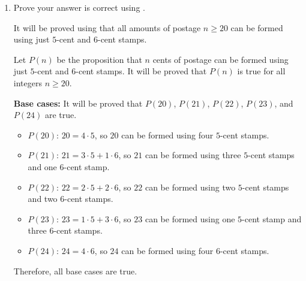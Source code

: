 \begin{enumerate}
\begin{enumerate}
\begin{subprove}
      Since \(k \geq 24\), consider any representation of \(k\) cents using \(5\)-cent and \(6\)-cent stamps.
      Two cases will be considered:
      \begin{itemize}
        \item \textbf{Case 1:} The representation uses at least one \(5\)-cent stamp.
        Then by replacing one \(5\)-cent stamp with one \(6\)-cent stamp, \(k+1 = k - 5 + 6\) cents can be formed.
        \item \textbf{Case 2:} The representation uses no \(5\)-cent stamps (only \(6\)-cent stamps).
        Since \(k \geq 24\) and \(k\) is formed using only \(6\)-cent stamps, there are at least \(\lceil 24/6 \rceil = 4\) stamps.
        By replacing four \(6\)-cent stamps (totaling \(24\) cents) with five \(5\)-cent stamps (totaling \(25\) cents), \(k+1 = k - 24 + 25 = k + 1\) cents can be formed.
      \end{itemize}
      In both cases, \(k+1\) cents can be formed.
      Therefore, \(P(k+1)\) is true.
      
      By , it follows that \(P(n)\) is true for all integers \(n \geq 20\).
      
      Therefore, all amounts of postage \(n \geq 20\) can be formed using just \(5\)-cent and \(6\)-cent stamps.
    \end{subprove}
    \item Prove your answer is correct using .
    \begin{subprove}
      It will be proved using  that all amounts of postage \(n \geq 20\) can be formed using just \(5\)-cent and \(6\)-cent stamps.
      
      Let \(P(n)\) be the proposition that \(n\) cents of postage can be formed using just \(5\)-cent and \(6\)-cent stamps.
      It will be proved that \(P(n)\) is true for all integers \(n \geq 20\).
      
      \textbf{Base cases:} It will be proved that \(P(20)\), \(P(21)\), \(P(22)\), \(P(23)\), and \(P(24)\) are true.
      \begin{itemize}
        \item \(P(20)\): \(20 = 4 \cdot 5\), so \(20\) can be formed using four \(5\)-cent stamps.
        \item \(P(21)\): \(21 = 3 \cdot 5 + 1 \cdot 6\), so \(21\) can be formed using three \(5\)-cent stamps and one \(6\)-cent stamp.
        \item \(P(22)\): \(22 = 2 \cdot 5 + 2 \cdot 6\), so \(22\) can be formed using two \(5\)-cent stamps and two \(6\)-cent stamps.
        \item \(P(23)\): \(23 = 1 \cdot 5 + 3 \cdot 6\), so \(23\) can be formed using one \(5\)-cent stamp and three \(6\)-cent stamps.
        \item \(P(24)\): \(24 = 4 \cdot 6\), so \(24\) can be formed using four \(6\)-cent stamps.
      \end{itemize}
      Therefore, all base cases are true.
      

\end{subprove}
\end{enumerate}
\end{enumerate}
